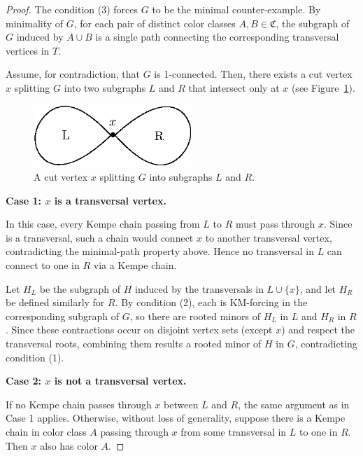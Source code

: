    \begin{proof}
 The condition (3) forces $G$ to be the minimal counter-example. By minimality of $G$, for each pair of distinct color classes $A, B \in \mathfrak{C}$, the subgraph of $G$ induced by $A \cup B$ is a single path connecting the corresponding transversal vertices in $T$.
   
 Assume, for contradiction, that $G$ is 1-connected. Then, there exists a cut vertex $x$
 splitting $G$ into two subgraphs $L$ and $R$ that intersect only at $x$ (see Figure~\ref{fig:general-case}).

    \begin{figure}[h]
      \centering
      \vspace{0.3cm}
      \includegraphics[width=6cm]{img/general-case.eps}
      \vspace{0.3cm}
      \caption{A cut vertex $x$ splitting $G$ into subgraphs $L$ and $R$.}
      \label{fig:general-case}
  \end{figure}
   
   \textbf{Case 1: $x$ is a transversal vertex.}
   
 In this case, every Kempe chain passing from $L$ to $R$ must pass through $x$.
 Since is a transversal, such a chain would connect $x$ to another transversal vertex,
 contradicting the minimal-path property above. Hence no transversal in $L$
 can connect to one in $R$ via a Kempe chain.
   
 Let $H_L$ be the subgraph of $H$ induced by the transversals in $L \cup \{x\}$,
 and let $H_R$ be defined similarly for $R$. By condition (2), 
 each is KM-forcing in the corresponding subgraph of $G$, 
 so there are rooted minors of $H_L$ in $L$ and $H_R$ in $R$. 
 Since these contractions occur on disjoint vertex sets (except $x$) and respect the transversal roots, 
 combining them results a rooted minor of $H$ in $G$, contradicting condition (1).
   
   \textbf{Case 2: $x$ is not a transversal vertex.}
   
 If no Kempe chain passes through $x$ between $L$ and $R$, the same argument as in Case 1 applies.
 Otherwise, without loss of generality, suppose there is a Kempe chain in color class $A$ passing
 through $x$ from some transversal in $L$ to one in $R$. Then $x$ also has color $A$.
   

\end{proof}
